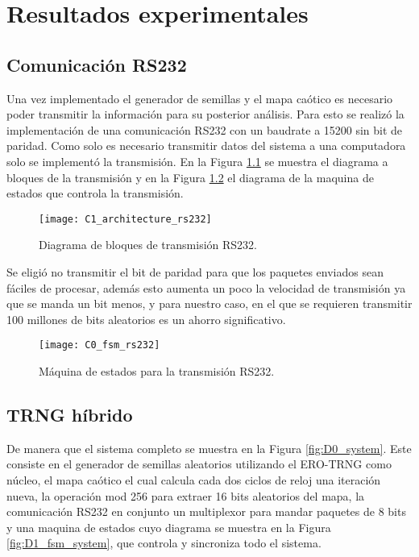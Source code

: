 \chapter{Resultados experimentales}

    \section{Comunicación RS232}

    Una vez implementado el generador de semillas y el mapa caótico es necesario poder transmitir la información para su posterior análisis. Para esto se realizó la implementación de una comunicación RS232 con un baudrate a 15200 sin bit de paridad. Como solo es necesario transmitir datos del sistema a una computadora  solo se implementó la transmisión. En la Figura \ref{fig:C1_architecture_rs232} se muestra el diagrama a bloques de la transmisión y en la Figura \ref{fig:C0_fsm_rs232} el diagrama de la maquina de estados que controla la transmisión.

        \begin{figure}[hbtp]
            \caption{Diagrama de bloques de transmisión RS232.}
            \centering
            \texttt{[image: C1\_architecture\_rs232]}
            \label{fig:C1_architecture_rs232}
        \end{figure}

        Se eligió no transmitir el bit de paridad para que los paquetes enviados sean fáciles de procesar, además esto aumenta un poco la velocidad de transmisión ya que se manda un bit menos, y para nuestro caso, en el que se requieren transmitir 100 millones de bits aleatorios es un ahorro significativo. 

        \begin{figure}[hbtp]
            \caption{Máquina de estados para la transmisión RS232.}
            \centering
            \texttt{[image: C0\_fsm\_rs232]}
            \label{fig:C0_fsm_rs232}
        \end{figure}	

    \section{TRNG híbrido}

        De manera que el sistema completo se muestra en la Figura \ref{fig:D0_system}. Este consiste en el generador de semillas aleatorios utilizando el ERO-TRNG como núcleo, el mapa caótico el cual calcula cada dos ciclos de reloj una iteración nueva, la operación mod 256 para extraer 16 bits aleatorios del mapa, la comunicación RS232 en conjunto un multiplexor para mandar paquetes de 8 bits y una maquina de estados cuyo diagrama se muestra en la Figura \ref{fig:D1_fsm_system}, que controla y sincroniza todo el sistema.

